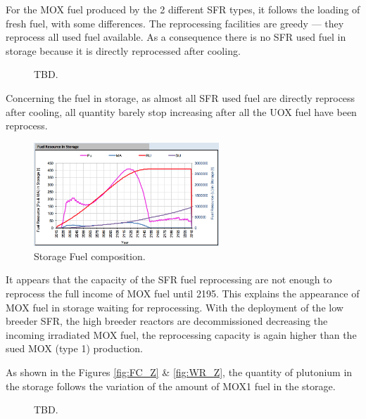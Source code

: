 \documentclass[12pt]{article}
\begin{document}
For the MOX fuel produced by the 2 different SFR types, it follows the loading
of fresh fuel, with some differences. The reprocessing facilities are greedy
--- they reprocess all used fuel available. As a consequence there is no SFR
used fuel in storage because it is directly reprocessed after cooling.

\begin{figure}[h!]
    \centering
    \caption{TBD.\label{fig:cool_reprocc} }
\end{figure}


Concerning the fuel in storage, as almost all SFR used fuel are directly
reprocess after cooling, all quantity barely stop increasing after all the UOX
fuel have been reprocess.

\begin{figure}[h!]
    \centering
    \includegraphics[width=0.62\textwidth]{img/FuelInStorage_1}
    \caption{Storage Fuel composition.}
    \label{fig:storagecompo_1}
\end{figure}

It appears that the capacity of the SFR fuel reprocessing are not enough to
reprocess the full income of MOX fuel until 2195. This explains the appearance
of MOX fuel in storage waiting for reprocessing. With the deployment of the
low breeder SFR, the high breeder reactors are decommissioned decreasing the
incoming irradiated MOX fuel,  the reprocessing capacity is again higher than
the sued MOX (type 1) production.


As shown in the Figures \ref{fig:FC_Z} \& \ref{fig:WR_Z}, the quantity of
plutonium in the storage follows the variation of the amount of MOX1 fuel in
the storage.

\begin{figure}[h!]
    \centering
    \caption{TBD.\label{fig:FC_WR_zoom} }
\end{figure}
\end{document}
